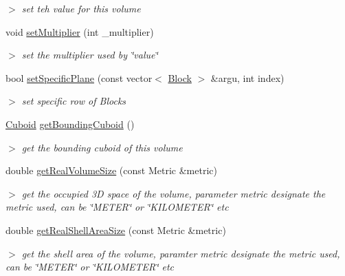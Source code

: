\begin{DoxyCompactItemize}
\begin{DoxyCompactList}\small\item\em $>$ set teh value for this volume \end{DoxyCompactList}\item 
\hypertarget{classVolume_ae0bbefbd2ec7c441b4591e3dac19811d}{void \hyperlink{classVolume_ae0bbefbd2ec7c441b4591e3dac19811d}{set\-Multiplier} (int \-\_\-multiplier)}\label{classVolume_ae0bbefbd2ec7c441b4591e3dac19811d}

\begin{DoxyCompactList}\small\item\em $>$ set the multiplier used by \char`\"{}value\char`\"{} \end{DoxyCompactList}\item 
\hypertarget{classVolume_aa235c4a97c27a591efc8ccb92401e557}{bool \hyperlink{classVolume_aa235c4a97c27a591efc8ccb92401e557}{set\-Specific\-Plane} (const vector$<$ \hyperlink{classBlock}{\-Block} $>$ \&argu, int index)}\label{classVolume_aa235c4a97c27a591efc8ccb92401e557}

\begin{DoxyCompactList}\small\item\em $>$ set specific row of \-Blocks \end{DoxyCompactList}\item 
\hyperlink{classCuboid}{\-Cuboid} \hyperlink{classVolume_a8207a496fa3c9fdbdc31589659886c7b}{get\-Bounding\-Cuboid} ()
\begin{DoxyCompactList}\small\item\em $>$ get the bounding cuboid of this volume \end{DoxyCompactList}\item 
double \hyperlink{classVolume_acdc52768ad67623cb33b2de02242c9f2}{get\-Real\-Volume\-Size} (const \-Metric \&metric)
\begin{DoxyCompactList}\small\item\em $>$ get the occupied 3\-D space of the volume, parameter metric designate the metric used, can be \char`\"{}\-M\-E\-T\-E\-R\char`\"{} or \char`\"{}\-K\-I\-L\-O\-M\-E\-T\-E\-R\char`\"{} etc \end{DoxyCompactList}\item 
double \hyperlink{classVolume_afa1984fe31ad7f5c5e0a261b01bb1d2a}{get\-Real\-Shell\-Area\-Size} (const \-Metric \&metric)
\begin{DoxyCompactList}\small\item\em $>$ get the shell area of the volume, paramter metric designate the metric used, can be \char`\"{}\-M\-E\-T\-E\-R\char`\"{} or \char`\"{}\-K\-I\-L\-O\-M\-E\-T\-E\-R\char`\"{} etc \end{DoxyCompactList}\end{DoxyCompactItemize}


